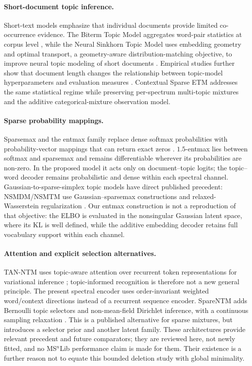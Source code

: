 \documentclass[10pt,a4paper]{article}
\begin{document}
\paragraph{Short-document topic inference.}
Short-text models emphasize that individual documents provide limited
co-occurrence evidence. The Biterm Topic Model aggregates word-pair statistics
at corpus level \cite{yan2013}, while the Neural Sinkhorn Topic Model uses
embedding geometry and optimal transport, a geometry-aware
distribution-matching objective, to improve neural topic modeling of short
documents \cite{zhao2021}. Empirical studies further show that document
length changes the relationship between topic-model hyperparameters and
evaluation measures \cite{terragni2021}. Contextual Sparse ETM addresses
the same statistical regime while preserving per-spectrum multi-topic mixtures
and the additive categorical-mixture observation model.

\paragraph{Sparse probability mappings.}
Sparsemax and the entmax family replace dense softmax probabilities with
probability-vector mappings that can return exact zeros
\cite{martins2016,peters2019}. $1.5$-entmax lies between softmax and sparsemax
and remains differentiable wherever its probabilities are non-zero. In the
proposed model it acts only on document--topic logits; the
topic--word decoder remains probabilistic and dense within each spectral
channel.
Gaussian-to-sparse-simplex topic models have direct published precedent:
NSMDM/NSMTM use Gaussian--sparsemax constructions and relaxed-Wasserstein
regularization \cite{lin2019}. Our entmax construction is not a reproduction of
that objective: the ELBO is evaluated in the nonsingular Gaussian latent
space, where its KL is well defined, while the additive embedding decoder
retains full vocabulary support within each channel.

\paragraph{Attention and explicit selection alternatives.}
TAN-NTM uses topic-aware attention over recurrent token representations for
variational inference \cite{panwar2021}; topic-informed recognition is therefore
not a new general principle. The present spectral encoder uses order-invariant
weighted word/context directions instead of a recurrent sequence encoder.
SpareNTM adds Bernoulli topic selectors and non-mean-field Dirichlet inference,
with a continuous sampling relaxation \cite{chen2023}. This is a published
alternative for sparse mixtures, but introduces a selector prior and another
latent family. These architectures provide relevant precedent and future
comparators; they are reviewed here, not newly fitted, and no MS$^n$Lib
performance claim is made for them. Their existence is a further reason not
to equate this bounded deletion study with global minimality.
\end{document}
